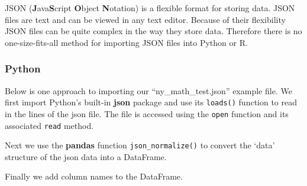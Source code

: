 \documentclass[
]{book}
\begin{document}
JSON (\textbf{J}ava\textbf{S}cript \textbf{O}bject \textbf{N}otation) is a flexible format for storing data. JSON files are text and can be viewed in any text editor. Because of their flexibility JSON files can be quite complex in the way they store data. Therefore there is no one-size-fits-all method for importing JSON files into Python or R.

\hypertarget{python-12}{%
\subsubsection*{Python}\label{python-12}}

Below is one approach to importing our ``ny\_math\_test.json'' example file. We first import Python's built-in \textbf{json} package and use its \texttt{loads()} function to read in the lines of the json file. The file is accessed using the \texttt{open} function and its associated \texttt{read} method.

Next we use the \textbf{pandas} function \texttt{json\_normalize()} to convert the `data' structure of the json data into a DataFrame.

Finally we add column names to the DataFrame.
\end{document}

